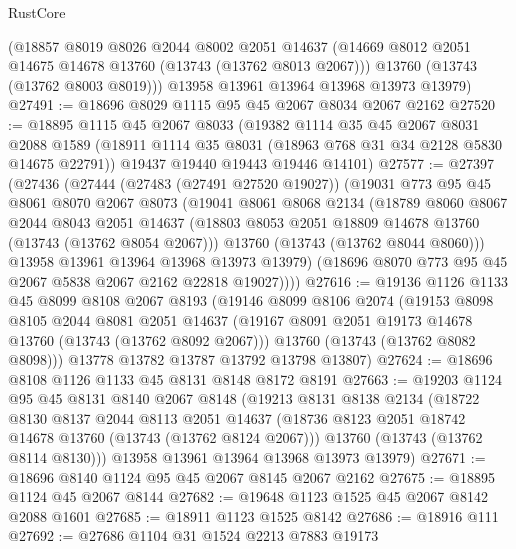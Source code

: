 \begin{lexlean}{RustCore}
\begin{coremodule}
      (@18857
        @8019
        @8026
        @2044
        @8002
        @2051
        @14637
        (@14669 @8012 @2051 @14675 @14678 @13760 (@13743 (@13762 @8013 @2067)))
        @13760
        (@13743 (@13762 @8003 @8019)))
      @13958
      @13961
      @13964
      @13968
      @13973
      @13979)
@27491 := @18696 @8029 @1115 @95 @45 @2067 @8034 @2067 @2162
@27520 := @18895
    @1115
    @45
    @2067
    @8033
    (@19382
      @1114
      @35
      @45
      @2067
      @8031
      @2088
      @1589
      (@18911 @1114 @35 @8031 (@18963 @768 @31 @34 @2128 @5830 @14675 @22791))
      @19437
      @19440
      @19443
      @19446
      @14101)
@27577 := @27397
    (@27436
      (@27444
        (@27483 (@27491 @27520 @19027))
        (@19031
          @773
          @95
          @45
          @8061
          @8070
          @2067
          @8073
          (@19041
            @8061
            @8068
            @2134
            (@18789
              @8060
              @8067
              @2044
              @8043
              @2051
              @14637
              (@18803 @8053 @2051 @18809 @14678 @13760 (@13743 (@13762 @8054 @2067)))
              @13760
              (@13743 (@13762 @8044 @8060)))
            @13958
            @13961
            @13964
            @13968
            @13973
            @13979)
          (@18696 @8070 @773 @95 @45 @2067 @5838 @2067 @2162 @22818 @19027))))
@27616 := @19136
    @1126
    @1133
    @45
    @8099
    @8108
    @2067
    @8193
    (@19146
      @8099
      @8106
      @2074
      (@19153
        @8098
        @8105
        @2044
        @8081
        @2051
        @14637
        (@19167 @8091 @2051 @19173 @14678 @13760 (@13743 (@13762 @8092 @2067)))
        @13760
        (@13743 (@13762 @8082 @8098)))
      @13778
      @13782
      @13787
      @13792
      @13798
      @13807)
@27624 := @18696 @8108 @1126 @1133 @45 @8131 @8148 @8172 @8191
@27663 := @19203
    @1124
    @95
    @45
    @8131
    @8140
    @2067
    @8148
    (@19213
      @8131
      @8138
      @2134
      (@18722
        @8130
        @8137
        @2044
        @8113
        @2051
        @14637
        (@18736 @8123 @2051 @18742 @14678 @13760 (@13743 (@13762 @8124 @2067)))
        @13760
        (@13743 (@13762 @8114 @8130)))
      @13958
      @13961
      @13964
      @13968
      @13973
      @13979)
@27671 := @18696 @8140 @1124 @95 @45 @2067 @8145 @2067 @2162
@27675 := @18895 @1124 @45 @2067 @8144
@27682 := @19648 @1123 @1525 @45 @2067 @8142 @2088 @1601
@27685 := @18911 @1123 @1525 @8142
@27686 := @18916 @111
@27692 := @27686 @1104 @31 @1524 @2213 @7883 @19173

\end{coremodule}
\end{lexlean}
